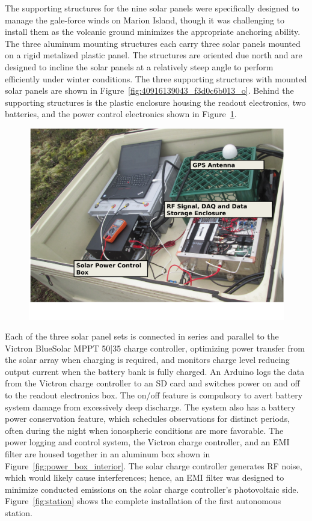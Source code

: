 The supporting structures for the nine solar panels were specifically designed to manage the gale-force winds on Marion Island, though it was challenging to install them as the volcanic ground minimizes the appropriate anchoring ability. The three aluminum mounting structures each carry three solar panels mounted on a rigid metalized plastic panel. The structures are oriented due north and are designed to incline the solar panels at a relatively steep angle to perform efficiently under winter conditions. The three supporting structures with mounted solar panels are shown in Figure~\ref{fig:40916139043_f3d0c6b013_o}. Behind the supporting structures is the plastic enclosure housing the readout electronics, two batteries, and the power control electronics shown in Figure~\ref{fig:bin}.

\begin{figure}
	\centering
	\includegraphics[width=0.7\linewidth]{Figures/bin}
	\caption{}
	\label{fig:bin}
\end{figure}


Each of the three solar panel sets is connected in series and parallel to the Victron BlueSolar MPPT 50|35 charge controller, optimizing power transfer from the solar array when charging is required, and monitors charge level reducing output current when the battery bank is fully charged. An Arduino logs the data from the Victron charge controller to an SD card and switches power on and off to the readout electronics box. The on/off feature is compulsory to avert battery system damage from excessively deep discharge. The system also has a battery power conservation feature, which schedules observations for distinct periods, often during the night when ionospheric conditions are more favorable. The power logging and control system, the Victron charge controller, and an EMI filter are housed together in an aluminum box shown in Figure~\ref{fig:power_box_interior}. The solar charge controller generates RF noise, which would likely cause interferences; hence, an EMI filter was designed to minimize conducted emissions on the solar charge controller's photovoltaic side. Figure~\ref{fig:station} shows the complete installation of the first autonomous station.

